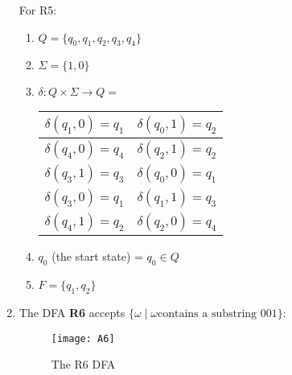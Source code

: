 \documentclass[11pt,a4paper]{article}
\begin{document}
\begin{enumerate}
                For R5:
                \begin{enumerate}
                    \item $Q = \{q_0, q_1, q_2, q_3, q_4\}$
                    \item $\Sigma = \{1, 0\}$
                    \item $\delta \colon Q \times \Sigma \rightarrow Q =$
                    \begin{tabular}{|c|c|} 
                        \hline
                        $\delta(q_1, 0) = q_1$ & $\delta(q_0, 1) = q_2$ \\
                        \hline
                        $\delta(q_4, 0) = q_4$ & $\delta(q_2, 1) = q_2$ \\
                        \hline
                        $\delta(q_3, 1) = q_3$ & $\delta(q_0, 0) = q_1$ \\
                        \hline
                        $\delta(q_3, 0) = q_1$ & $\delta(q_1, 1) = q_3$ \\
                        \hline
                        $\delta(q_4, 1) = q_2$ & $\delta(q_2, 0) = q_4$ \\
                        \hline
                   \end{tabular}
                    \item $q_0$ (the start state) = $q_0 \in Q$
                    \item $F = \{q_1, q_2\}$
                \end{enumerate}

            \item The DFA \textbf{R6} accepts $\{\omega\mid\omega\text{contains a substring 001}\}$:\\
                \begin{figure}[H]
                    \centering
                    \texttt{[image: A6]}
                    \caption{The R6 DFA}
                \end{figure}


\end{enumerate}
\end{document}
